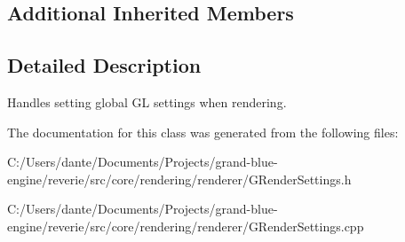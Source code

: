 \subsection*{Additional Inherited Members}


\subsection{Detailed Description}
Handles setting global GL settings when rendering. 

The documentation for this class was generated from the following files\+:\begin{DoxyCompactItemize}
\item 
C\+:/\+Users/dante/\+Documents/\+Projects/grand-\/blue-\/engine/reverie/src/core/rendering/renderer/G\+Render\+Settings.\+h\item 
C\+:/\+Users/dante/\+Documents/\+Projects/grand-\/blue-\/engine/reverie/src/core/rendering/renderer/G\+Render\+Settings.\+cpp\end{DoxyCompactItemize}
